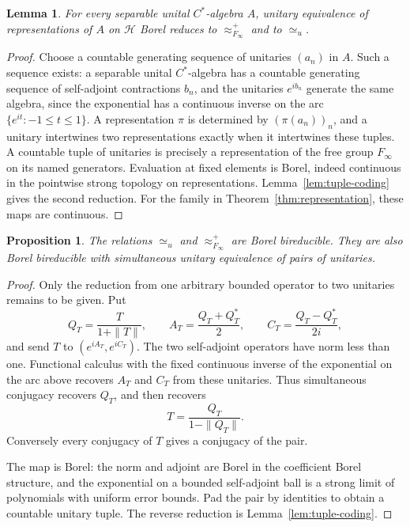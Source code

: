 \documentclass[11pt]{article}
\newtheorem{proposition}[theorem]{Proposition}
\newtheorem{lemma}[theorem]{Lemma}
\theoremstyle{definition}
\begin{document}
\begin{lemma}\label{lem:algebra-coding}
For every separable unital $C^*$-algebra $A$, unitary equivalence of
representations of $A$ on $\mathcal H$ Borel reduces to
$\approx^+_{F_\infty}$ and to ${\simeq_u}$.
\end{lemma}
\begin{proof}
Choose a countable generating sequence of unitaries $(a_n)$ in $A$.
Such a sequence exists: a separable unital $C^*$-algebra has a countable
generating sequence of self-adjoint contractions $b_n$, and the
unitaries $e^{ib_n}$ generate the same algebra, since the exponential
has a continuous inverse on the arc $\{e^{it}:-1\le t\le1\}$.
A representation $\pi$ is determined by $(\pi(a_n))_n$, and a unitary
intertwines two representations exactly when it intertwines these
tuples. A countable tuple of unitaries is precisely a representation
of the free group $F_\infty$ on its named generators.
Evaluation at fixed elements is Borel, indeed continuous in the
pointwise strong topology on representations. Lemma~\ref{lem:tuple-coding}
gives the second reduction. For the family in
Theorem~\ref{thm:representation}, these maps are continuous.
\end{proof}

\begin{proposition}\label{prop:operator-group}
The relations ${\simeq_u}$ and $\approx^+_{F_\infty}$ are
Borel bireducible. They are also Borel bireducible with simultaneous
unitary equivalence of pairs of unitaries.
\end{proposition}
\begin{proof}
Only the reduction from one arbitrary bounded operator to two
unitaries remains to be given. Put
\[
 Q_T=\frac{T}{1+\|T\|},\qquad
 A_T=\frac{Q_T+Q_T^*}{2},\qquad
 C_T=\frac{Q_T-Q_T^*}{2i},
\]
and send $T$ to $(e^{iA_T},e^{iC_T})$.
The two self-adjoint operators have norm less than one. Functional
calculus with the fixed continuous inverse of the exponential on the
arc above recovers $A_T$ and $C_T$ from these unitaries. Thus simultaneous
conjugacy recovers $Q_T$, and then recovers
\[
 T=\frac{Q_T}{1-\|Q_T\|}.
\]
Conversely every conjugacy of $T$ gives a conjugacy of the pair.

The map is Borel: the norm and adjoint are Borel in the coefficient
Borel structure, and the exponential on a bounded self-adjoint ball
is a strong limit of polynomials with uniform error bounds.
Pad the pair by identities to obtain a countable unitary tuple.
The reverse reduction is Lemma~\ref{lem:tuple-coding}.
\end{proof}
\end{document}

